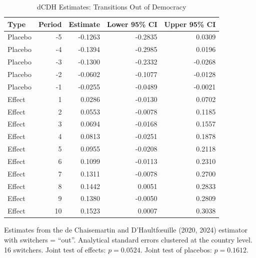\begin{table}[H]
\centering
\caption{\label{tab:dcdh-out-table}dCDH Estimates: Transitions Out of Democracy}
\centering
\begin{threeparttable}
\begin{tabular}[t]{lrrrr}
\toprule
Type & Period & Estimate & Lower 95\% CI & Upper 95\% CI\\
\midrule
Placebo & -5 & -0.1263 & -0.2835 & 0.0309\\
Placebo & -4 & -0.1394 & -0.2985 & 0.0196\\
Placebo & -3 & -0.1300 & -0.2332 & -0.0268\\
Placebo & -2 & -0.0602 & -0.1077 & -0.0128\\
Placebo & -1 & -0.0255 & -0.0489 & -0.0021\\
\addlinespace
Effect & 1 & 0.0286 & -0.0130 & 0.0702\\
Effect & 2 & 0.0553 & -0.0078 & 0.1185\\
Effect & 3 & 0.0694 & -0.0168 & 0.1557\\
Effect & 4 & 0.0813 & -0.0251 & 0.1878\\
Effect & 5 & 0.0955 & -0.0208 & 0.2118\\
\addlinespace
Effect & 6 & 0.1099 & -0.0113 & 0.2310\\
Effect & 7 & 0.1311 & -0.0078 & 0.2700\\
Effect & 8 & 0.1442 & 0.0051 & 0.2833\\
Effect & 9 & 0.1380 & -0.0050 & 0.2809\\
Effect & 10 & 0.1523 & 0.0007 & 0.3038\\
\bottomrule
\end{tabular}
\begin{tablenotes}
\item Estimates from the de Chaisemartin and D'Haultf\oe uille (2020, 2024) estimator with switchers = ``out''. Analytical standard errors clustered at the country level. 16 switchers. Joint test of effects: $p = 0.0524$. Joint test of placebos: $p = 0.1612$.
\end{tablenotes}
\end{threeparttable}
\end{table}
